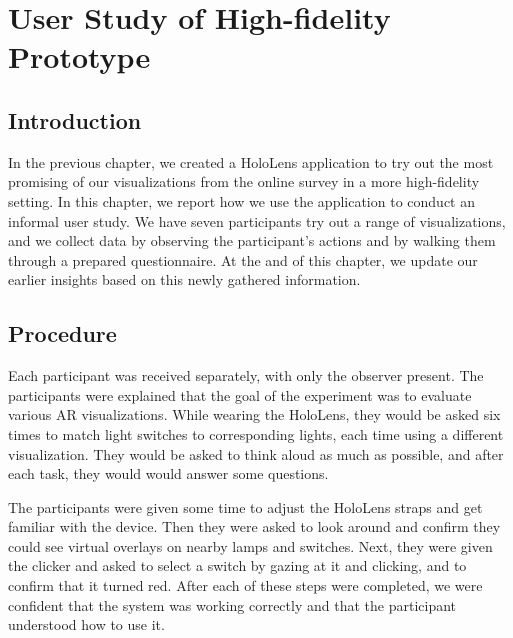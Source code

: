 \chapter{User Study of High-fidelity Prototype} \label{chap:user}

\section{Introduction} \label{sec:user:survey:intro}
In the previous chapter, we created a HoloLens application to try out the most promising of our visualizations from the online survey in a more high-fidelity setting. In this chapter, we report how we use the application to conduct an informal user study. We have seven participants try out a range of visualizations, and we collect data by observing the participant's actions and by walking them through a prepared questionnaire. At the and of this chapter, we update our earlier insights based on this newly gathered information.

\section{Procedure} \label{sec:user:survey:procedure}
Each participant was received separately, with only the observer present. The participants were explained that the goal of the experiment was to evaluate various AR visualizations. While wearing the HoloLens, they would be asked six times to match light switches to corresponding lights, each time using a different visualization. They would be asked to think aloud as much as possible, and after each task, they would would answer some questions.

The participants were given some time to adjust the HoloLens straps and get familiar with the device. Then they were asked to look around and confirm they could see virtual overlays on nearby lamps and switches. Next, they were given the clicker and asked to select a switch by gazing at it and clicking, and to confirm that it turned red. After each of these steps were completed, we were confident that the system was working correctly and that the participant understood how to use it.

